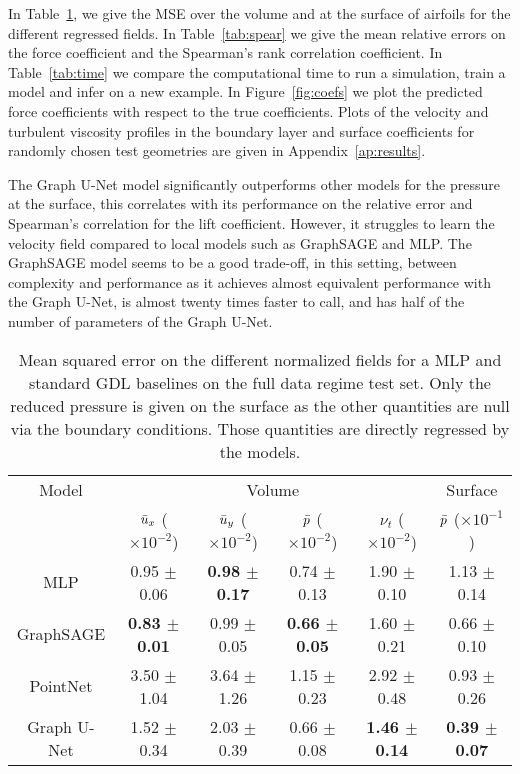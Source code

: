 In Table~\ref{tab:MSE}, we give the MSE over the volume and at the surface of airfoils for the different regressed fields. In Table~\ref{tab:spear} we give the mean relative errors on the force coefficient and the Spearman's rank correlation coefficient. In Table~\ref{tab:time} we compare the computational time to run a simulation, train a model and infer on a new example. In Figure~\ref{fig:coefs} we plot the predicted force coefficients with respect to the true coefficients. Plots of the velocity and turbulent viscosity profiles in the boundary layer and surface coefficients for randomly chosen test geometries are given in Appendix~\ref{ap:results}. 

The Graph U-Net model significantly outperforms other models for the pressure at the surface, this correlates with its performance on the relative error and Spearman's correlation for the lift coefficient. However, it struggles to learn the velocity field compared to local models such as GraphSAGE and MLP. The GraphSAGE model seems to be a good trade-off, in this setting, between complexity and performance as it achieves almost equivalent performance with the Graph U-Net, is almost twenty times faster to call, and has half of the number of parameters of the Graph U-Net.

\begin{table}
	\caption{Mean squared error on the different normalized fields for a MLP and standard GDL baselines on the full data regime test set. Only the reduced pressure is given on the surface as the other quantities are null via the boundary conditions. Those quantities are directly regressed by the models.}
	\label{tab:MSE}
	\centering
	\begin{tabular}{cccccc}
		\toprule
		Model & \multicolumn{4}{c}{Volume} & Surface  \\
		& $\Bar{u}_x$ ($\times 10^{-2}$) & $\Bar{u}_y$ ($\times 10^{-2}$) & $\Bar{p}$ ($\times 10^{-2}$) & $\nu_t$ ($\times 10^{-2}$) & $\Bar{p}$ ($\times 10^{-1}$) \\
		\midrule
		MLP & 0.95 $\pm$ 0.06 & \textbf{0.98 $\pm$ 0.17} & 0.74 $\pm$ 0.13 & 1.90 $\pm$ 0.10 & 1.13 $\pm$ 0.14 \\
		GraphSAGE & \textbf{0.83 $\pm$ 0.01} & 0.99 $\pm$ 0.05 & \textbf{0.66 $\pm$ 0.05} & 1.60 $\pm$ 0.21 & 0.66 $\pm$ 0.10 \\
		PointNet & 3.50 $\pm$ 1.04 & 3.64 $\pm$ 1.26 & 1.15 $\pm$ 0.23 & 2.92 $\pm$ 0.48 & 0.93 $\pm$ 0.26 \\
		Graph U-Net & 1.52 $\pm$ 0.34 & 2.03 $\pm$ 0.39 & 0.66 $\pm$ 0.08 & \textbf{1.46 $\pm$ 0.14} & \textbf{0.39 $\pm$ 0.07} \\
		\bottomrule
	\end{tabular}
\end{table}

